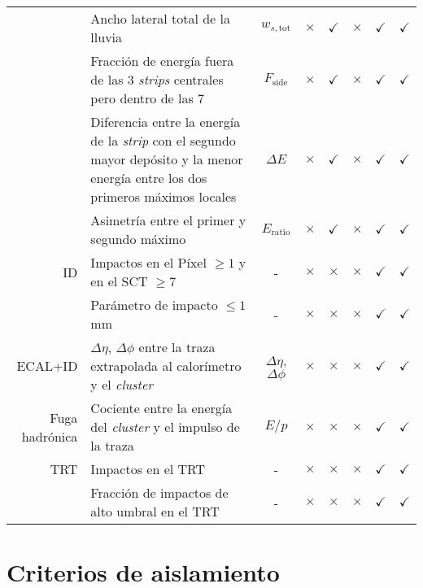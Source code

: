 \begin{table}
\begin{tabular}{ r p{8cm} c | c c | c c c }
		& Ancho lateral total de la lluvia & $w_{s,\text{tot}}$ & $\times$ & $\checkmark$ & $\times$ & $\checkmark$ & $\checkmark$ \\

		& Fracción de energía fuera de las 3 \textit{strips} centrales pero dentro de las 7 & $F_{\text{side}}$ & $\times$ & $\checkmark$ & $\times$ & $\checkmark$ & $\checkmark$ \\

		& Diferencia entre la energía de la \textit{strip} con el segundo mayor depósito y la menor energía entre los dos primeros máximos locales & $\Delta E$ & $\times$ & $\checkmark$ & $\times$ & $\checkmark$ & $\checkmark$ \\

		& Asimetría entre el primer y segundo máximo & $E_{\text{ratio}}$ & $\times$ & $\checkmark$ & $\times$ & $\checkmark$ & $\checkmark$ \\

	ID & Impactos en el Píxel $\ge 1$ y en el SCT $\ge 7$ & - & $\times$ & $\times$ & $\times$ & $\checkmark$ & $\checkmark$ \\

		& Parámetro de impacto $\le 1$ mm & - & $\times$ & $\times$ & $\times$ & $\checkmark$ & $\checkmark$ \\

	ECAL+ID & $\Delta\eta$, $\Delta\phi$ entre la traza extrapolada al calorímetro y el \textit{cluster} & $\Delta\eta$, $\Delta\phi$ & $\times$ & $\times$ & $\times$ & $\checkmark$ & $\checkmark$ \\

	Fuga hadrónica & Cociente entre la energía del \textit{cluster} y el impulso de la traza & $E/p$ & $\times$ & $\times$ & $\times$ & $\checkmark$ & $\checkmark$ \\

	TRT & Impactos en el TRT & - & $\times$ & $\times$ & $\times$ & $\checkmark$ & $\checkmark$ \\

		& Fracción de impactos de alto umbral en el TRT & - & $\times$ & $\times$ & $\times$ & $\checkmark$ & $\checkmark$ \\

	\hline

\end{tabular}
\label{lmttable}
\end{table}
\renewcommand{\arraystretch}{1}




\section{Criterios de aislamiento}

